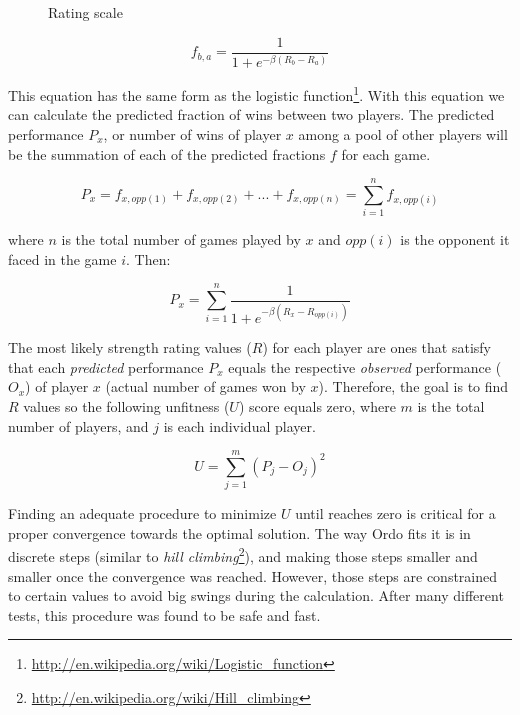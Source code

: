 \documentclass[12pt]{article}
\begin{document}
	\begin{figure}[htb]
	\caption{\label{fig:figlevels2} Rating scale}
	\end{figure}


	\begin{equation} \label{eq:flipped}
	f_{b,a}  = \frac{1}{1 + e^{-\beta(R_{b}-R_{a})}}
	\end{equation}

This equation has the same form as the logistic function\footnote{\url{http://en.wikipedia.org/wiki/Logistic_function}}.
With this equation we can calculate the predicted fraction of wins between two players. 
The predicted performance $P_{x}$, or number of wins of player $x$ among a pool of other players will be the summation of each of the predicted fractions $f$ for each game.

	\begin{equation}
	P_{x} = f_{x,opp(1)} + f_{x,opp(2)} + ... + f_{x,opp(n)} = \sum\limits_{i=1}^n f_{x,opp(i)}
	\end{equation}

where $n$ is the total number of games played by $x$ and $opp(i)$ is the opponent it faced in the game $i$. Then:

	\begin{equation}
	P_{x} = \sum\limits_{i=1}^n \frac{1}{1 + e^{-\beta(R_{x}-R_{opp(i)})}}
	\end{equation}

The most likely strength rating values ($R$) for each player are ones that satisfy that each \textit{predicted} performance $P_{x}$ equals the respective \textit{observed} performance ($O_{x}$) of player $x$ (actual number of games won by $x$). 
Therefore, the goal is to find $R$ values so the following unfitness ($U$) score equals zero, where $m$ is the total number of players, and $j$ is each individual player.

	\begin{equation}
	U = \sum\limits_{j=1}^m (P_{j} - O_{j})^2
	\end{equation}

Finding an adequate procedure to minimize $U$ until reaches zero is critical for a proper convergence towards the optimal solution. 
The way Ordo fits it is in discrete steps (similar to \textit{hill climbing}\footnote{\url{http://en.wikipedia.org/wiki/Hill_climbing}}), and making those steps smaller and smaller once the convergence was reached. 
However, those steps are constrained to certain values to avoid big swings during the calculation.
After many different tests, this procedure was found to be safe and fast. 
\end{document}
